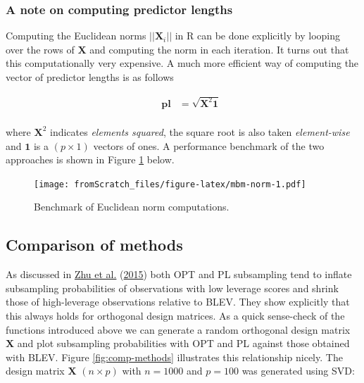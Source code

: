 \documentclass[
]{book}
\begin{document}
\hypertarget{a-note-on-computing-predictor-lengths}{%
\subsubsection{A note on computing predictor lengths}\label{a-note-on-computing-predictor-lengths}}

Computing the Euclidean norms \(||\mathbf{X}_i||\) in R can be done explicitly by looping over the rows of \(\mathbf{X}\) and computing the norm in each iteration. It turns out that this computationally very expensive. A much more efficient way of computing the vector of predictor lengths is as follows

\[
\begin{equation} 
\begin{aligned}
&& \mathbf{pl}&=\sqrt{\mathbf{X}^2 \mathbf{1}} \\
\end{aligned}
\label{eq:norm}
\end{equation}
\]

where \(\mathbf{X}^2\) indicates \emph{elements squared}, the square root is also taken \emph{element-wise} and \(\mathbf{1}\) is a \((p \times 1)\) vectors of ones. A performance benchmark of the two approaches is shown in Figure \ref{fig:mbm-norm} below.

\begin{figure}
\centering
\texttt{[image: fromScratch\_files/figure-latex/mbm-norm-1.pdf]}
\caption{\label{fig:mbm-norm}Benchmark of Euclidean norm computations.}
\end{figure}

\hypertarget{comparison-of-methods}{%
\subsection{Comparison of methods}\label{comparison-of-methods}}

As discussed in \protect\hyperlink{ref-zhu2015optimal}{Zhu et al.} (\protect\hyperlink{ref-zhu2015optimal}{2015}) both OPT and PL subsampling tend to inflate subsampling probabilities of observations with low leverage scores and shrink those of high-leverage observations relative to BLEV. They show explicitly that this always holds for orthogonal design matrices. As a quick sense-check of the functions introduced above we can generate a random orthogonal design matrix \(\mathbf{X}\) and plot subsampling probabilities with OPT and PL against those obtained with BLEV. Figure \ref{fig:comp-methods} illustrates this relationship nicely. The design matrix \(\mathbf{X}\) \((n \times p)\) with \(n=1000\) and \(p=100\) was generated using SVD:
\end{document}
